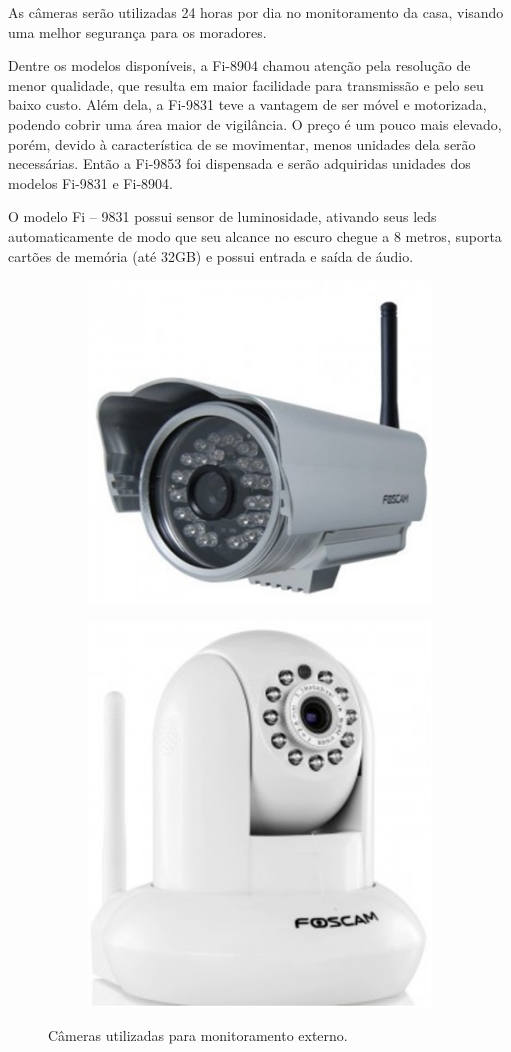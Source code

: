 	As câmeras serão utilizadas 24 horas por dia no monitoramento da casa, visando uma melhor segurança para os moradores.

	Dentre os modelos disponíveis, a Fi-8904 chamou atenção pela resolução de menor qualidade, que resulta em maior facilidade para transmissão e pelo seu baixo custo. Além dela, a Fi-9831 teve a vantagem de ser móvel e motorizada, podendo cobrir uma área maior de vigilância. O preço é um pouco mais elevado, porém, devido à característica de se movimentar, menos unidades dela serão necessárias. Então a Fi-9853 foi dispensada e serão adquiridas unidades dos modelos Fi-9831 e Fi-8904.

	 O modelo Fi – 9831 possui sensor de luminosidade, ativando seus leds automaticamente de modo que seu alcance no escuro chegue a 8 metros, suporta cartões de memória (até 32GB) e possui entrada e saída de áudio.

\begin{figure}[H]
\centering
\begin{subfigure}{.45\textwidth}
	\centering
	\includegraphics[width=.7\linewidth,keepaspectratio,angle=0]{figuras/camera1.eps}
\end{subfigure}\hfill
\begin{subfigure}{.45\textwidth}
	\centering
	\includegraphics[width=.5\linewidth,keepaspectratio,angle=0]{figuras/camera2.eps}
\end{subfigure}
\caption{Câmeras utilizadas para monitoramento externo.}
\end{figure}

